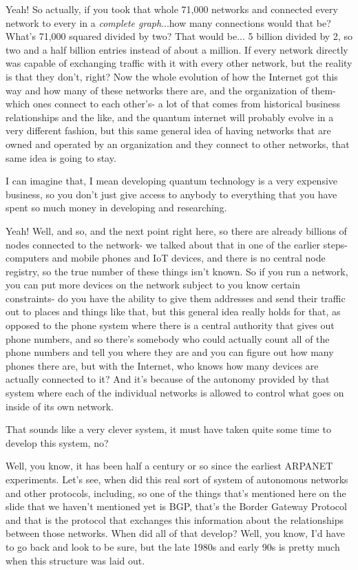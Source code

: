 \rrr Yeah! So actually, if you took that whole 71,000 networks and connected every network to every in a \emph{complete graph}...how many connections would that be?  What's 71,000 squared divided by two? That would be... 5 billion divided by 2, so two and a half billion entries instead of about a million. If every network directly was capable of exchanging traffic with it with every other network, but the reality is that they don't, right? Now the whole evolution of how the Internet got this way and how many of these networks there are, and the organization of them- which ones connect to each other's- a lot of that comes from historical business relationships and the like, and the quantum internet will probably evolve in a very different fashion, but this same general idea of having networks that are owned and operated by an organization and they connect to other networks, that same idea is going to stay.

\mmm I can imagine that, I mean developing quantum technology is a very expensive business, so you don't just give access to anybody to everything that you have spent so much money in developing and researching.

\rrr Yeah! Well, and so, and the next point right here, so there are already billions of nodes connected to the network- we talked about that in one of the earlier steps- computers and mobile phones and IoT devices, and there is no central node registry, so the true number of these things isn't known. So if you run a network, you can put more devices on the network subject to you know certain constraints- do you have the ability to give them addresses and send their traffic out to places and things like that, but this general idea really holds for that, as opposed to the phone system where there is a central authority that gives out phone numbers, and so there's somebody who could actually count all of the phone numbers and tell you where they are and you can figure out how many phones there are, but with the Internet, who knows how many devices are actually connected to it? And it's because of the autonomy provided by that system where each of the individual networks is allowed to control what goes on inside of its own network.

\mmm That sounds like a very clever system, it must have taken quite some time to develop this system, no?

\rrr Well, you know, it has been half a century or so since the earliest ARPANET experiments.  Let's see, when did this real sort of system of autonomous networks and other protocols, including, so one of the things that's mentioned here on the slide that we haven't mentioned yet is BGP, that's the Border Gateway Protocol and that is the protocol that exchanges this information about the relationships between those networks. When did all of that develop? Well, you know, I'd have to go back and look to be sure, but the late 1980s and early 90s is pretty much when this structure was laid out.

